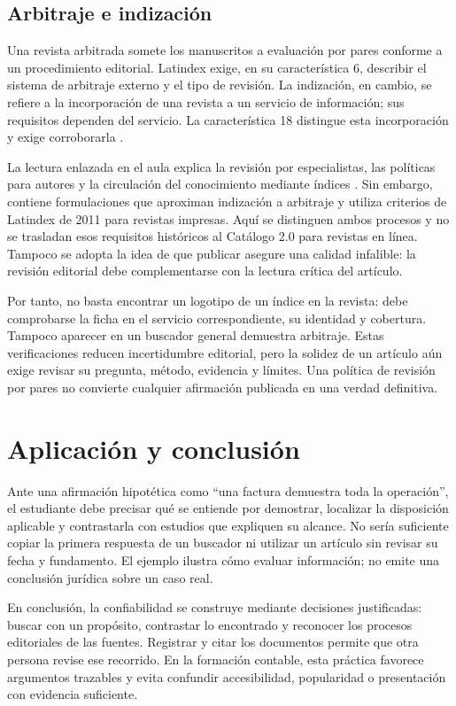 \subsection{Arbitraje e indización}
Una revista arbitrada somete los manuscritos a evaluación por pares conforme a un procedimiento editorial. Latindex exige, en su característica 6, describir el sistema de arbitraje externo y el tipo de revisión. La indización, en cambio, se refiere a la incorporación de una revista a un servicio de información; sus requisitos dependen del servicio. La característica 18 distingue esta incorporación y exige corroborarla \parencite{latindex2025}.

La lectura enlazada en el aula explica la revisión por especialistas, las políticas para autores y la circulación del conocimiento mediante índices \parencite[pp.~1--3]{revistasaula}. Sin embargo, contiene formulaciones que aproximan indización a arbitraje y utiliza criterios de Latindex de 2011 para revistas impresas. Aquí se distinguen ambos procesos y no se trasladan esos requisitos históricos al Catálogo 2.0 para revistas en línea. Tampoco se adopta la idea de que publicar asegure una calidad infalible: la revisión editorial debe complementarse con la lectura crítica del artículo.

Por tanto, no basta encontrar un logotipo de un índice en la revista: debe comprobarse la ficha en el servicio correspondiente, su identidad y cobertura. Tampoco aparecer en un buscador general demuestra arbitraje. Estas verificaciones reducen incertidumbre editorial, pero la solidez de un artículo aún exige revisar su pregunta, método, evidencia y límites. Una política de revisión por pares no convierte cualquier afirmación publicada en una verdad definitiva.

\section{Aplicación y conclusión}
Ante una afirmación hipotética como \enquote{una factura demuestra toda la operación}, el estudiante debe precisar qué se entiende por demostrar, localizar la disposición aplicable y contrastarla con estudios que expliquen su alcance. No sería suficiente copiar la primera respuesta de un buscador ni utilizar un artículo sin revisar su fecha y fundamento. El ejemplo ilustra cómo evaluar información; no emite una conclusión jurídica sobre un caso real.

En conclusión, la confiabilidad se construye mediante decisiones justificadas: buscar con un propósito, contrastar lo encontrado y reconocer los procesos editoriales de las fuentes. Registrar y citar los documentos permite que otra persona revise ese recorrido. En la formación contable, esta práctica favorece argumentos trazables y evita confundir accesibilidad, popularidad o presentación con evidencia suficiente.


